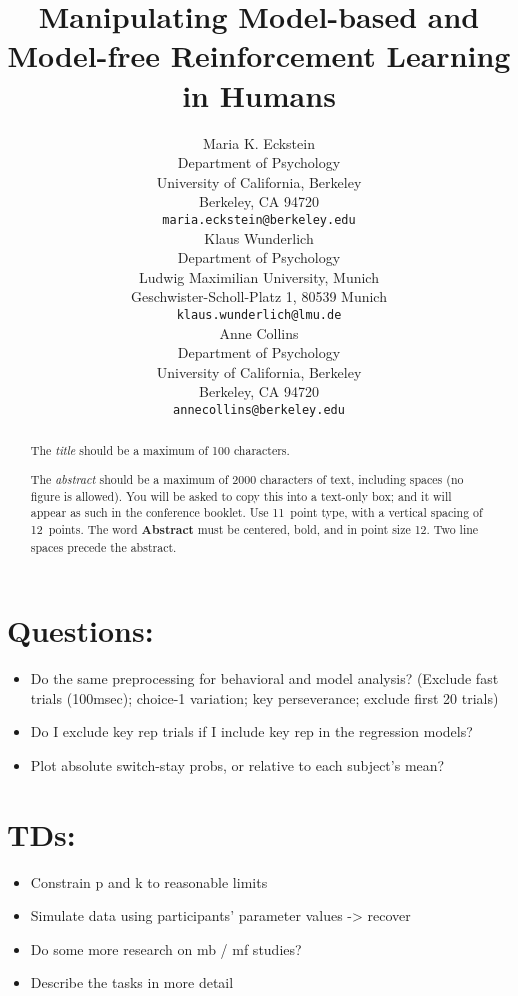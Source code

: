 \documentclass[11pt]{article} %
\title{Manipulating Model-based and Model-free Reinforcement Learning in Humans}
\author{
Maria K. Eckstein \\
Department of Psychology \\
University of California, Berkeley \\
Berkeley, CA 94720 \\
\texttt{maria.eckstein@berkeley.edu} \\
\And
Klaus Wunderlich \\
Department of Psychology \\
Ludwig Maximilian University, Munich \\
Geschwister-Scholl-Platz 1, 80539 Munich \\
\texttt{klaus.wunderlich@lmu.de} \\
\And
Anne Collins \\
Department of Psychology\\
University of California, Berkeley \\
Berkeley, CA 94720  \\
\texttt{annecollins@berkeley.edu} \\
}
\begin{document}
\maketitle

\begin{abstract}
The \emph{title} should be a maximum of 100 characters. 

The \emph{abstract} should be a maximum of 2000 characters of text,
including spaces (no figure is allowed). You will be asked to copy
this into a text-only box; and it will appear as such in the
conference booklet. Use 11~point type, with a vertical spacing of
12~points.  The word \textbf{Abstract} must be centered, bold, and in
point size 12. Two line spaces precede the abstract.
\end{abstract}




\startmain %

\section{Questions:}
\begin{itemize}
	\item Do the same preprocessing for behavioral and model analysis? (Exclude fast trials (100msec); choice-1 variation; key perseverance; exclude first 20 trials)
	\item Do I exclude key rep trials if I include key rep in the regression models?
	\item Plot absolute switch-stay probs, or relative to each subject's mean?
\end{itemize}

\section{TDs:}
\begin{itemize}
	\item Constrain p and k to reasonable limits
	\item Simulate data using participants' parameter values -> recover
	\item Do some more research on mb / mf studies?
	\item Describe the tasks in more detail
\end{itemize}
\end{document}
